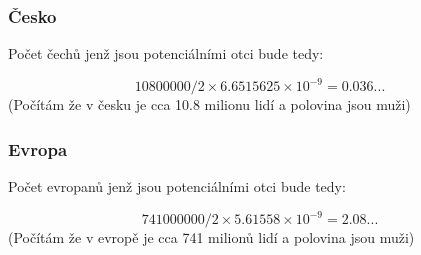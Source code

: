 \documentclass{article}
\begin{document}
\subsubsection*{Česko}
Počet čechů jenž jsou potenciálními otci bude tedy: 

\[
10800000/2 \times 6.6515625 \times 10^{-9} = 0.036...
\]
(Počítám že v česku je cca 10.8 milionu lidí a polovina jsou muži)

\subsubsection*{Evropa}
Počet evropanů jenž jsou potenciálními otci bude tedy:

\[
741000000/2 \times 5.61558 \times 10^{-9} = 2.08...
\]
(Počítám že v evropě je cca 741 milionů lidí a polovina jsou muži)
\end{document}

